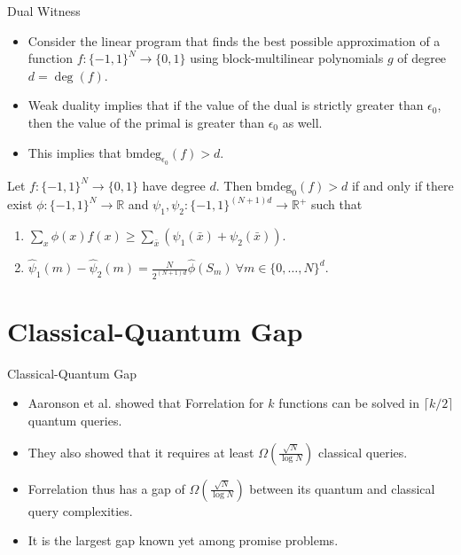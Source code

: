 \documentclass[10pt]{beamer}
\newcommand{\bmdeg}{\mathrm{bmdeg}}
\begin{document}
\begin{frame}{Dual Witness}
\begin{itemize}
    \item Consider the linear program that finds the best possible approximation of a function $f\colon \{-1,1\}^N \rightarrow \{0,1\}$ using block-multilinear polynomials $g$ of degree $d = \deg(f)$.
    \item Weak duality implies that if the value of the dual is strictly greater than $\epsilon_0$, then the value of the primal is greater than $\epsilon_0$ as well.
    \item This implies that $\bmdeg_{\epsilon_0}(f) > d$.
\end{itemize}
\begin{theorem}
Let $f\colon \{-1,1\}^N \rightarrow \{0,1\}$ have degree $d$. Then $\bmdeg_{0}(f) > d$ if and only if there exist $\phi\colon \{-1,1\}^N \rightarrow \mathbb{R}$ and $\psi_1, \psi_2\colon \{-1,1\}^{(N+1)d} \rightarrow \mathbb{R^+}$ such that \begin{enumerate}
    \item $\sum_x \phi(x)f(x) \geq \sum_{\bar{x}} (\psi_1(\bar{x}) + \psi_2(\bar{x})).$
    \item ${\hat{\psi}}_1(m) - {\hat{\psi}}_2(m) = \frac{N}{2^{(N+1)d}} \hat{\phi}(S_m) ~\forall m\in \{0, \ldots, N\}^d.$
\end{enumerate} 
\end{theorem}
\end{frame}

\section{Classical-Quantum Gap}

\begin{frame}{Classical-Quantum Gap}
\begin{itemize}
    \item Aaronson et al. \cite{paper1} showed that Forrelation for $k$ functions can be solved in $\lceil k/2 \rceil$ quantum queries.
    \item They also showed that it requires at least $\Omega(\frac{\sqrt{N}}{\log N})$ classical queries.
    \item Forrelation thus has a gap of $\Omega(\frac{\sqrt{N}}{\log N})$ between its quantum and classical query complexities.
    \item It is the largest gap known yet among promise problems.
\end{itemize}
\end{frame}
\end{document}
